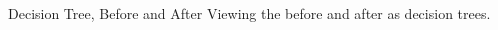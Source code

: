 \begin{frame}{Decision Tree, Before and After}
  Viewing the  before and after as decision trees.

  \begin{columns}
    \begin{column}{0.5\textwidth}
      \usebox\typecaseITEbox
    \end{column}
    \begin{column}{0.5\textwidth}  %
      \usebox\typecaseITEafterbox
    \end{column}
  \end{columns}
\end{frame}




